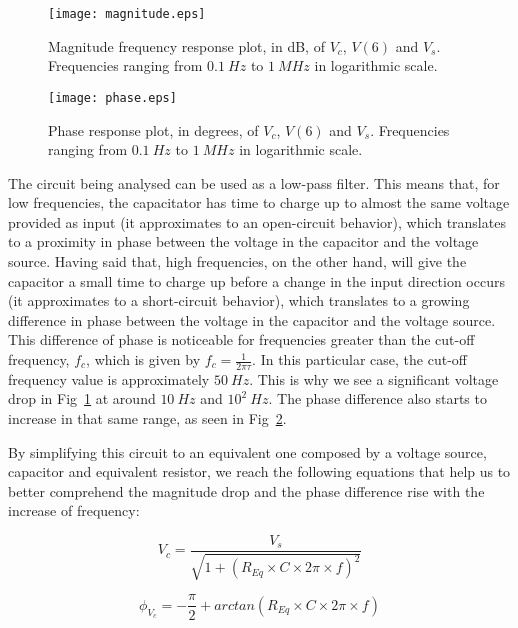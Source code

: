 \begin{figure}[h] \centering
\texttt{[image: magnitude.eps]}
	\caption{Magnitude frequency response plot, in dB, of $V_{c}$, $V(6)$ and $V_{s}$. Frequencies ranging from $0.1~Hz$ to $1~MHz$ in logarithmic scale.}
        \label{fig:mag}
\end{figure}


\begin{figure}[h] \centering
\texttt{[image: phase.eps]}
	\caption{Phase response plot, in degrees, of $V_{c}$, $V(6)$ and $V_{s}$. Frequencies ranging from $0.1~Hz$ to $1~MHz$ in logarithmic scale.}
        \label{fig:phase}
\end{figure}



The circuit being analysed can be used as a low-pass filter. This means that, for low frequencies, the capacitator has time to charge up to almost the same voltage provided as input (it approximates to an open-circuit behavior), which translates to a proximity in phase between the voltage in the capacitor and the voltage source. Having said that, high frequencies, on the other hand, will give the capacitor a small time to charge up before a change in the input direction occurs (it approximates to a short-circuit behavior), which translates to a growing difference in phase between the voltage in the capacitor and the voltage source. This difference of phase is noticeable for frequencies greater than the cut-off frequency, $f_c$, which is given by $f_c = \frac{1}{2\pi\tau}$. In this particular case, the cut-off frequency value is approximately $50~Hz$. This is why we see a significant voltage drop in Fig~\ref{fig:mag} at around $10~Hz$ and $10^2~Hz$. The phase difference also starts to increase in that same range, as seen in Fig~\ref{fig:phase}.

By simplifying this circuit to an equivalent one composed by a voltage source, capacitor and equivalent resistor, we reach the following equations that help us to better comprehend the magnitude drop and the phase difference rise with the increase of frequency:

\begin{equation}
  V_c = \frac{V_s}{\sqrt{1 + (R_{Eq}\times C\times 2\pi\times f)^2}}
  \label{eq:equivalent1}
\end{equation}

\begin{equation}
  \phi_{V_c} = -\frac{\pi}{2} + arctan(R_{Eq}\times C\times 2\pi\times f)
  \label{eq:equivalent2}
\end{equation}

